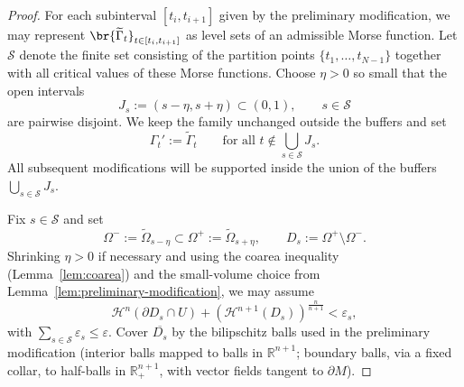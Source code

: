 \begin{lemma}
\begin{proof}
        For each subinterval $[t_i,t_{i+1}]$ given by the preliminary modification, we may represent
        $\br{\widetilde{\Gamma}_t}_{t\in[t_i,t_{i+1}]}$ as level sets of an admissible Morse function.
        Let $\mathcal{S}$ denote the finite set consisting of the partition points $\{t_1,\dots,t_{N-1}\}$ together
        with all critical values of these Morse functions. Choose $\eta>0$ so small that the open intervals
        \begin{equation*}
            J_s:=(s-\eta,s+\eta)\subset(0,1),\qquad s\in\mathcal{S}
        \end{equation*}
        are pairwise disjoint. We keep the family unchanged outside the buffers and set
        \begin{equation*}
            \Gamma_t':=\widetilde{\Gamma}_t\qquad\text{for all }t\notin \bigcup_{s\in\mathcal S}J_s.
        \end{equation*}
        All subsequent modifications will be supported inside the union of the buffers $\bigcup_{s\in\mathcal S}J_s$.
        
        Fix $s\in\mathcal S$ and set
        \begin{equation*}
            \Omega^-:=\widetilde{\Omega}_{s-\eta}\subset \Omega^+:=\widetilde{\Omega}_{s+\eta},
            \qquad
            D_s:=\Omega^+\setminus\Omega^-.
        \end{equation*}
        Shrinking $\eta>0$ if necessary and using the coarea inequality (Lemma~\ref{lem:coarea}) and the small-volume choice from Lemma~\ref{lem:preliminary-modification}, we may assume
        \begin{equation*}
          \mathcal{H}^n(\partial D_s\cap U)+
          (\mathcal{H}^{n+1}(D_s))^{\frac{n}{n+1}}
          <\varepsilon_s,
        \end{equation*}
        with $\sum_{s\in\mathcal S}\varepsilon_s\le \varepsilon$. Cover $\overline{D_s}$ by the bilipschitz balls used in the preliminary modification (interior balls mapped to balls in $\mathbb R^{n+1}$; boundary balls, via a fixed collar, to half-balls in $\mathbb R^{n+1}_+$, with vector fields tangent to $\partial M$).
        

\end{proof}
\end{lemma}

